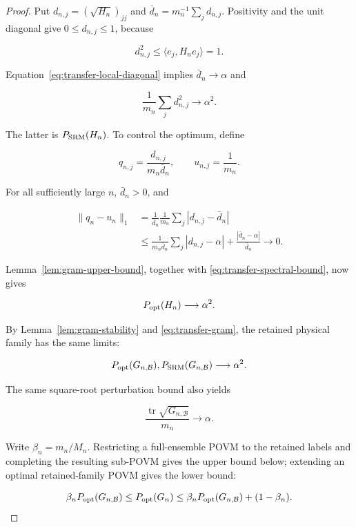 \begin{proof}
Put \(d_{n,j}=(\sqrt{H_n})_{jj}\) and
\(\bar d_n=m_n^{-1}\sum_jd_{n,j}\). Positivity and the unit diagonal give
\(0\le d_{n,j}\le1\), because

\[
d_{n,j}^2
\le\langle e_j,H_ne_j\rangle=1.
\]

Equation~\eqref{eq:transfer-local-diagonal} implies
\(\bar d_n\to\alpha\) and

\[
\frac1{m_n}\sum_jd_{n,j}^2\longrightarrow\alpha^2.
\]

The latter is \(P_{\rm SRM}(H_n)\). To control the optimum, define

\[
q_{n,j}=\frac{d_{n,j}}{m_n\bar d_n},
\qquad u_{n,j}=\frac1{m_n}.
\]

For all sufficiently large \(n\), \(\bar d_n>0\), and

\begin{align*}
\|q_n-u_n\|_1
&=\frac1{\bar d_n}
\frac1{m_n}\sum_j|d_{n,j}-\bar d_n|\\
&\le
\frac{1}{m_n\bar d_n}\sum_j|d_{n,j}-\alpha|
+\frac{|\bar d_n-\alpha|}{\bar d_n}
\longrightarrow0.
\end{align*}

Lemma~\ref{lem:gram-upper-bound}, together with
\eqref{eq:transfer-spectral-bound}, now gives

\[
P_{\rm opt}(H_n)\longrightarrow\alpha^2.
\]

By Lemma~\ref{lem:gram-stability} and
\eqref{eq:transfer-gram}, the retained physical family has the same limits:

\begin{equation}
\label{eq:transfer-retained-limits}
P_{\rm opt}(G_{n,\mathcal B}),
P_{\rm SRM}(G_{n,\mathcal B})\longrightarrow\alpha^2.
\end{equation}

The same square-root perturbation bound also yields

\begin{equation}
\label{eq:transfer-retained-trace}
\frac{\operatorname{tr}\sqrt{G_{n,\mathcal B}}}{m_n}
\longrightarrow\alpha.
\end{equation}

Write \(\beta_n=m_n/M_n\). Restricting a full-ensemble POVM to the retained
labels and completing the resulting sub-POVM gives the upper bound below;
extending an optimal retained-family POVM gives the lower bound:

\begin{equation}
\label{eq:transfer-optimum-sandwich}
\beta_nP_{\rm opt}(G_{n,\mathcal B})
\le P_{\rm opt}(G_n)
\le\beta_nP_{\rm opt}(G_{n,\mathcal B})+(1-\beta_n).
\end{equation}


\end{proof}
